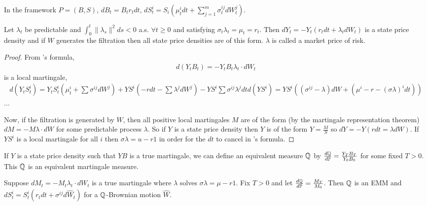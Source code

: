 
In the framework $P = (B, S)$, $dB_{t} = B_{t} r_{t} dt$, $dS^{i}_{t} =
S_{i}(\mu^{i}_{t} dt + \sum_{j=1}^{m} \sigma^{ij}_{t} dW^{j}_{t})$. 

\begin{thm}
  \label{defn:continuous_time:30}
  Let $\lambda_{t}$ be predictable and $\int_{0}^{t} \| \lambda_{s}
  \|^{2} ds < 0$ a.s. $\forall t \geq 0$ and satisfying $\sigma_{t}
  \lambda_{t} = \mu_{t} = r_{t}$.  Then $dY_{t} = -Y_{t}(r_{t} dt +
  \lambda_{t} dW_{t})$ is a state price density and if $W$ generates
  the filtration then all state price densities are of this form.
  $\lambda$ is called a market price of risk.
\end{thm}

\begin{proof}
  From \ito's formula,
  \begin{align}
    \label{eq:75}
    d(Y_{t} B_{t}) = -Y_{t} B_{t} \lambda_{t} \cdot dW_{t}
  \end{align} is a local martingale,
  \begin{align}
    \label{eq:76}
    d(Y_{t} S_{t}^{i}) = Y_{t}S_{t}^{i}(\mu^{i}_{t} + \sum \sigma^{ij}
    dW^{j}) + YS^{i}(-r dt - \sum \lambda^{j} dW^{j}) - Y S^{i} \sum
    \sigma^{ij} \lambda^{j} dt
    d(YS^{i}) = YS^{i}((\sigma^{ij} - \lambda) dW + (\mu^{i} - r -
    (\sigma \lambda)^{i} dt))
  \end{align}
  ...

  Now, if the filtration is generated by $W$, then all positive local
  martingales $M$ are of the form (by the martingale representation
  theorem) $dM = -M \lambda \cdot dW$ for some predictable process
  $\lambda$.  So if $Y$ is a state price density then $Y$ is of the
  form $Y = \frac{M}{S}$ so $dY = - Y(rdt = \lambda dW)$.  If $YS^{i}$
  is a local martingale for all $i$ then $\sigma \lambda = u - r1$ in
  order for the $dt$ to cancel in \ito's formula.
\end{proof}

If $Y$ is a state price density such that $YB$ is a true martingale,
we can define an equivalent measure $\Q$ by $\frac{d\Q}{d\Prob} =
\frac{Y_{T} B_{T}}{Y_{0} B_{0}}$ for some fixed $T > 0$.  This $\Q$ is
an equivalent martingale measure.

\begin{thm}
  \label{defn:continuous_time:31}
  Suppose $dM_{t} = -M_{t} \lambda_{t} \cdot dW_{t}$ is a true
  martingale where $\lambda$ solves $\sigma \lambda = \mu - r1$.  Fix
  $T > 0$ and let $\frac{d\Q}{d\Prob} = \frac{M_{T}}{M_{0}}$.  Then
  $\Q$ is an EMM and $dS_{t}^{i} = S_{t}^{i}(r_{t} dt + \sigma^{ij}
  d\hat W_{t})$ for a $\Q$-Brownian motion $\hat W$.
\end{thm}

